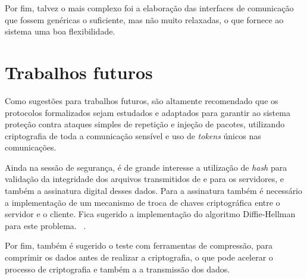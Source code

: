     Por fim, talvez o mais complexo foi a elaboração das interfaces de comunicação que fossem genéricas o suficiente, mas não muito relaxadas, o que fornece ao sistema uma boa flexibilidade.
    
    \section{Trabalhos futuros}
    
    Como sugestões para trabalhos futuros, são altamente recomendado que os protocolos formalizados sejam estudados e adaptados para garantir ao sistema proteção contra ataques simples de repetição e injeção de pacotes, utilizando criptografia de toda a comunicação sensível e uso de \textit{tokens} únicos nas comunicações.
    
    Ainda na sessão de segurança, é de grande interesse a utilização de \textit{hash} para validação da integridade dos arquivos transmitidos de e para os servidores, e também a assinatura digital desses dados. Para a assinatura também é necessário a implementação de um mecanismo de troca de chaves criptográfica entre o servidor e o cliente. Fica sugerido a implementação do algoritmo Diffie-Hellman  para este problema. ~\cite{merkle1978secure}.
    
    Por fim, também é sugerido o teste com ferramentas de compressão, para comprimir os dados antes de realizar a criptografia, o que pode acelerar o processo de criptografia e também a a transmissão dos dados.